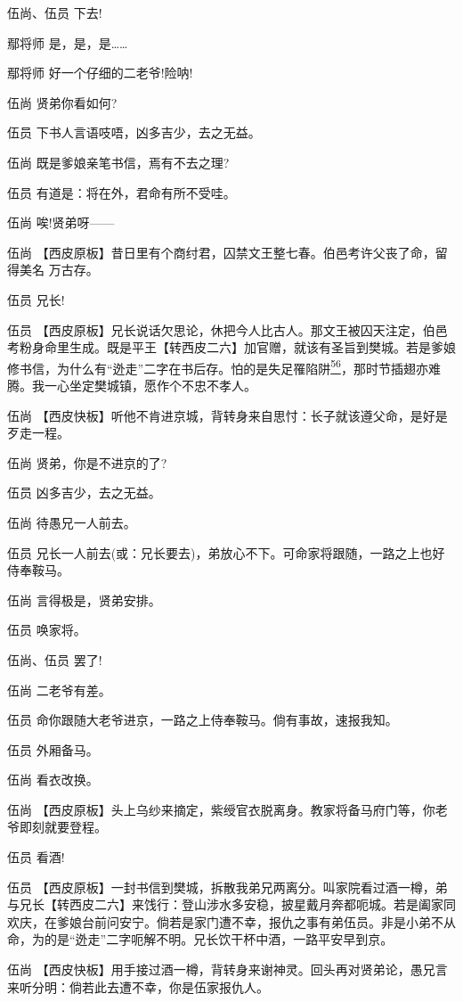 伍尚、伍员 下去!

鄢将师 是，是，是\ldots{}\ldots{}

鄢将师 好一个仔细的二老爷!险呐!

伍尚 贤弟你看如何?

伍员 下书人言语吱唔，凶多吉少，去之无益。

伍尚 既是爹娘亲笔书信，焉有不去之理?

伍员 有道是：将在外，君命有所不受哇。

伍尚 唉!贤弟呀------

伍尚
【西皮原板】昔日里有个商纣君，囚禁文王整七春。伯邑考许父丧了命，留得美名
万古存。

伍员 兄长!

伍员
【西皮原板】兄长说话欠思论，休把今人比古人。那文王被囚天注定，伯邑考粉身命里生成。既是平王【转西皮二六】加官赠，就该有圣旨到樊城。若是爹娘修书信，为什么有``迯走''二字在书后存。怕的是失足罹陷阱\protect\hyperlink{fn56}{\textsuperscript{56}}，那时节插翅亦难腾。我一心坐定樊城镇，愿作个不忠不孝人。

伍尚
【西皮快板】听他不肯进京城，背转身来自思忖：长子就该遵父命，是好是歹走一程。

伍尚 贤弟，你是不进京的了?

伍员 凶多吉少，去之无益。

伍尚 待愚兄一人前去。

伍员
兄长一人前去(或：兄长要去)，弟放心不下。可命家将跟随，一路之上也好侍奉鞍马。

伍尚 言得极是，贤弟安排。

伍员 唤家将。

伍尚、伍员 罢了!

伍尚 二老爷有差。

伍员 命你跟随大老爷进京，一路之上侍奉鞍马。倘有事故，速报我知。

伍员 外厢备马。

伍尚 看衣改换。

伍尚
【西皮原板】头上乌纱来摘定，紫绶官衣脱离身。教家将备马府门等，你老爷即刻就要登程。

伍员 看酒!

伍员
【西皮原板】一封书信到樊城，拆散我弟兄两离分。叫家院看过酒一樽，弟与兄长【转西皮二六】来饯行：登山涉水多安稳，披星戴月奔都呃城。若是阖家同欢庆，在爹娘台前问安宁。倘若是家门遭不幸，报仇之事有弟伍员。非是小弟不从命，为的是``迯走''二字呃解不明。兄长饮干杯中酒，一路平安早到京。

伍尚
【西皮快板】用手接过酒一樽，背转身来谢神灵。回头再对贤弟论，愚兄言来听分明：倘若此去遭不幸，你是伍家报仇人。

